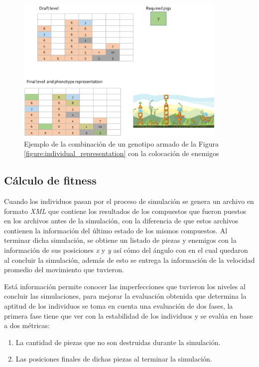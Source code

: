 \begin{figure}
  \centering
  \includegraphics[width=0.9\textwidth]{img/layer123_combine.png}
  \caption{Ejemplo de la combinación de un genotipo armado de la Figura \ref{figure:individual_representation} con la colocación de enemigos}
  \label{figure:ind_representation_plus_pigs}
\end{figure}

\subsection{Cálculo de fitness}
\label{subsection:fitness_calculation}

Cuando los individuos pasan por el proceso de simulación se genera un archivo en
formato \textit{XML} que contiene los resultados de los compuestos que fueron
puestos en los archivos antes de la simulación, con la diferencia de que estos
archivos contienen la información del último estado de los mismos compuestos. Al
terminar dicha simulación, se obtiene un listado de piezas y enemigos con
la información de sus posiciones \textit{x} y \textit{y} así cómo del ángulo con
en el cual quedaron al concluir la simulación, además de esto se entrega la
información de la velocidad promedio del movimiento que tuvieron.

Está información permite conocer las imperfecciones que tuvieron los niveles al
concluir las simulaciones, para mejorar la evaluación obtenida que determina la
aptitud de los individuos se toma en cuenta una evaluación de dos fases, la
primera fase tiene que ver con la estabilidad de los individuos y se evalúa en
base a dos métricas:
\begin{enumerate}
    \item La cantidad de piezas que no son destruidas durante la simulación.
    \item Las posiciones finales de dichas piezas al terminar la simulación.
\end{enumerate}

